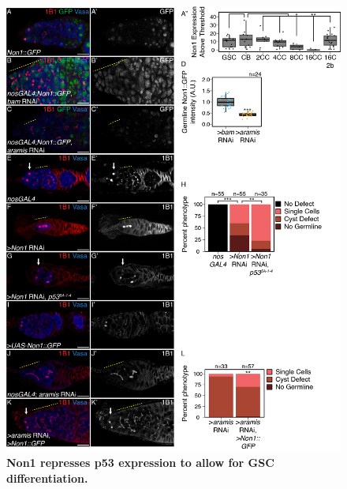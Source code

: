 \documentclass[12pt,oneside]{reedthesis}
\begin{document}
\begin{figure}

{\centering \includegraphics[width=6.5 in,height=8.9375 in]{./figure/Ribosome Biogenesis/Ribosome Biogenesis 5} 

}

\caption[\textbf{Non1 represses p53 expression to allow for GSC differentiation.}]{\textbf{Non1 represses p53 expression to allow for GSC differentiation.}}\label{fig:unnamed-chunk-9}
\end{figure}
\end{document}
